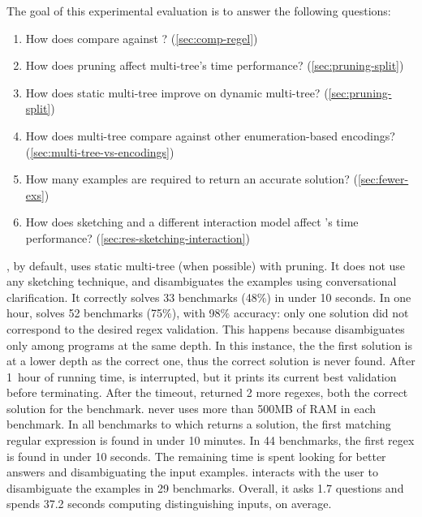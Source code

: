 \bigskip\noindent
The goal of this experimental evaluation is to answer the following questions:

\begin{enumerate}[label=\textbf{Q\arabic*}.]
%
\item How does \Forest{} compare against \Regel? (\autoref{sec:comp-regel})
%
\item How does pruning affect multi-tree's time performance? (\autoref{sec:pruning-split})
%
\item How does %
static multi-tree improve on dynamic multi-tree? (\autoref{sec:pruning-split})
%
\item How does multi-tree compare against other enumeration-based encodings? (\autoref{sec:multi-tree-vs-encodings})
%
\item How many examples are required to return an accurate solution? (\autoref{sec:fewer-exs})
%
\item How does sketching and a different interaction model affect \Forest's time performance? (\autoref{sec:res-sketching-interaction})
\end{enumerate}




\Forest{}, by default, uses static multi-tree (when possible) with pruning. It does not use any sketching technique, and disambiguates the examples using conversational clarification. It correctly solves 33 benchmarks (48\%) in under 10 seconds.
In one hour, \Forest{} solves 52 benchmarks (75\%), with 98\% accuracy: only one solution did not correspond to the desired regex validation. This happens because \Forest disambiguates only among programs at the same depth. In this instance, the the first solution is at a lower depth as the correct one, thus the correct solution is never found. 
After 1~hour of running time, \Forest{} is interrupted, but it prints its current best validation before terminating.
After the timeout, \Forest{} returned 2 more regexes, both the correct solution for the benchmark. \Forest{} never uses more than 500MB of RAM in each benchmark.
%
In all benchmarks to which \Forest returns a solution, the first matching regular expression is found in under 10 minutes. In 44 benchmarks, the first regex is found in under 10 seconds.  The remaining time is spent looking for better answers and disambiguating the input examples. 
\Forest interacts with the user to disambiguate the examples in 29 benchmarks. Overall, it asks 1.7 questions and spends 37.2 seconds computing distinguishing inputs, on average. 

